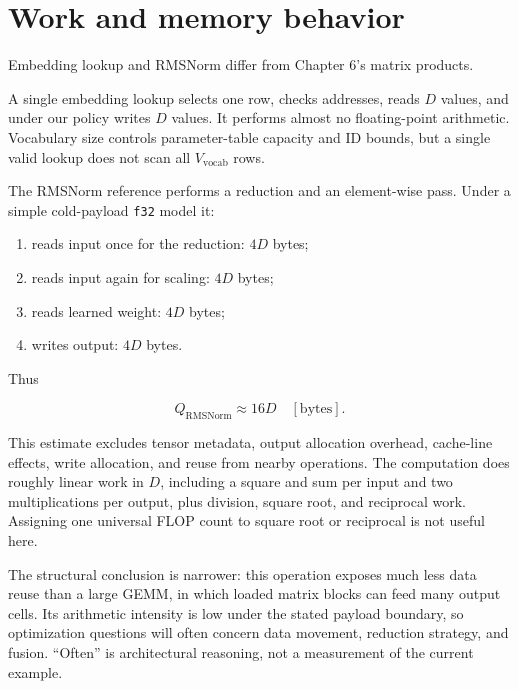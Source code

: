 \section{Work and memory behavior}\label{work-and-memory-behavior}


Embedding lookup and RMSNorm differ from Chapter 6's matrix products.

A single embedding lookup selects one row, checks addresses, reads \(D\)
values, and under our policy writes \(D\) values. It performs almost no
floating-point arithmetic. Vocabulary size controls parameter-table
capacity and ID bounds, but a single valid lookup does not scan all
\(V_{\mathrm{vocab}}\) rows.

The RMSNorm reference performs a reduction and an element-wise pass.
Under a simple cold-payload \texttt{f32} model it:

\begin{enumerate}
\def\labelenumi{\arabic{enumi}.}
\tightlist
\item
  reads input once for the reduction: \(4D\) bytes;
\item
  reads input again for scaling: \(4D\) bytes;
\item
  reads learned weight: \(4D\) bytes;
\item
  writes output: \(4D\) bytes.
\end{enumerate}

Thus

\begin{equation}
Q_{\mathrm{RMSNorm}}\approx16D\quad[\mathrm{bytes}].
\end{equation}

This estimate excludes tensor metadata, output allocation overhead,
cache-line effects, write allocation, and reuse from nearby operations.
The computation does roughly linear work in \(D\), including a square
and sum per input and two multiplications per output, plus division,
square root, and reciprocal work. Assigning one universal FLOP count to
square root or reciprocal is not useful here.

The structural conclusion is narrower: this operation exposes much less
data reuse than a large GEMM, in which loaded matrix blocks can feed
many output cells. Its arithmetic intensity is low under the stated
payload boundary, so optimization questions will often concern data
movement, reduction strategy, and fusion. ``Often'' is architectural
reasoning, not a measurement of the current example.

